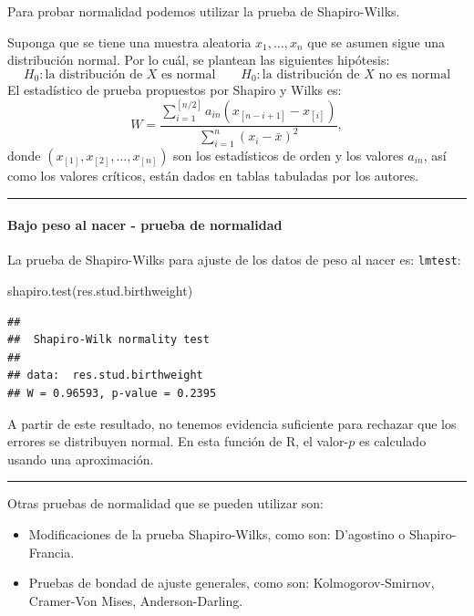 \documentclass[
]{article}
\newenvironment{Shaded}{\begin{snugshade}}{\end{snugshade}}
\newcommand{\FunctionTok}[1]{\textcolor[rgb]{0.00,0.00,0.00}{#1}}
\newcommand{\NormalTok}[1]{#1}
\providecommand{\tightlist}{%
  \setlength{\itemsep}{0pt}\setlength{\parskip}{0pt}}
\begin{document}
Para probar normalidad podemos utilizar la prueba de Shapiro-Wilks.

Suponga que se tiene una muestra aleatoria \(x_{1},\ldots,x_{n}\) que se asumen sigue una distribución normal. Por lo cuál, se plantean las siguientes hipótesis:
\[
H_{0}: \mbox{la distribución de }X \mbox{ es normal} \qquad H_{0}: \mbox{la distribución de }X \mbox{ no es normal}
\]
El estadístico de prueba propuestos por Shapiro y Wilks es:
\[
W = \frac{ \sum_{i=1}^{[n/2]}a_{in}\left(x_{[n-i+1]}-x_{[i]}\right)  }{\sum_{i=1}^{n}(x_{i}-\bar{x})^{2}},
\]
donde \((x_{[1]},x_{[2]},\ldots,x_{[n]})\) son los estadísticos de orden y los valores \(a_{in}\), así como los valores críticos, están dados en tablas tabuladas por los autores.

\rule{\textwidth}{0.4pt}

\hypertarget{bajo-peso-al-nacer---prueba-de-normalidad}{%
\paragraph*{Bajo peso al nacer - prueba de normalidad}\label{bajo-peso-al-nacer---prueba-de-normalidad}}

La prueba de Shapiro-Wilks para ajuste de los datos de peso al nacer es:
\texttt{lmtest}:

\begin{Shaded}
\begin{Highlighting}[]
\FunctionTok{shapiro.test}\NormalTok{(res.stud.birthweight)}
\end{Highlighting}
\end{Shaded}

\begin{verbatim}
## 
##  Shapiro-Wilk normality test
## 
## data:  res.stud.birthweight
## W = 0.96593, p-value = 0.2395
\end{verbatim}

A partir de este resultado, no tenemos evidencia suficiente para rechazar que los errores se distribuyen normal. En esta función de R, el valor-\(p\) es calculado usando una aproximación.

\rule{\textwidth}{0.4pt}

Otras pruebas de normalidad que se pueden utilizar son:

\begin{itemize}
\tightlist
\item
  Modificaciones de la prueba Shapiro-Wilks, como son: D'agostino o Shapiro-Francia.
\item
  Pruebas de bondad de ajuste generales, como son: Kolmogorov-Smirnov, Cramer-Von Mises, Anderson-Darling.
\end{itemize}
\end{document}
